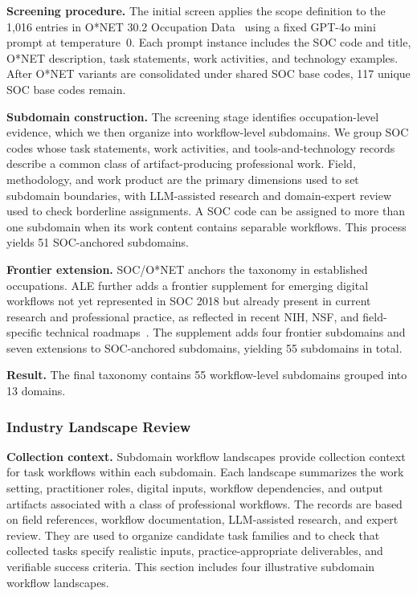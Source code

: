 \documentclass{llmxive}
\providecommand{\taskcount}{55}
\providecommand{\clustercount}{13}
\begin{document}
\noindent \textbf{Screening procedure.}
The initial screen applies the scope definition to the 1{,}016 entries in O*NET 30.2 Occupation
Data~\citep{onet302database} using a fixed GPT-4o mini prompt at temperature~0. Each prompt
instance includes the SOC code and title, O*NET description, task statements, work activities, and
technology examples. After O*NET variants are consolidated under shared SOC base codes, 117 unique
SOC base codes remain.

\noindent \textbf{Subdomain construction.}
The screening stage identifies occupation-level evidence, which we then organize into workflow-level
subdomains. We group SOC codes whose task statements, work activities, and tools-and-technology
records describe a common class of artifact-producing professional work. Field, methodology, and
work product are the primary dimensions used to set subdomain boundaries, with LLM-assisted
research and domain-expert review used to check borderline assignments. A SOC code can be assigned
to more than one subdomain when its work content contains separable workflows. This process yields
51 SOC-anchored subdomains.

\noindent \textbf{Frontier extension.}
SOC/O*NET anchors the taxonomy in established occupations. ALE further adds a frontier supplement
for emerging digital workflows not yet represented in SOC 2018 but already present in current
research and professional practice, as reflected in recent NIH, NSF, and field-specific technical
roadmaps~\citep{nih2021strategicplan,nsb2024sei,uschips2022,nsfchips2024,nist2023airmf}.
The supplement adds four frontier subdomains and seven extensions to SOC-anchored subdomains,
yielding \taskcount{} subdomains in total.

\noindent \textbf{Result.}
The final taxonomy contains \taskcount{} workflow-level subdomains grouped into \clustercount{}
domains.

\subsubsection{Industry Landscape Review}
\label{app:industry-landscape}

\noindent \textbf{Collection context.}
Subdomain workflow landscapes provide collection context for task workflows within each subdomain.
Each landscape summarizes the work setting, practitioner roles, digital inputs, workflow
dependencies, and output artifacts associated with a class of professional workflows. The records
are based on field references, workflow documentation, LLM-assisted research, and expert
review. They are used to organize candidate task families and to check that collected tasks specify
realistic inputs, practice-appropriate deliverables, and verifiable success criteria. This section
includes four illustrative subdomain workflow landscapes.
\end{document}
